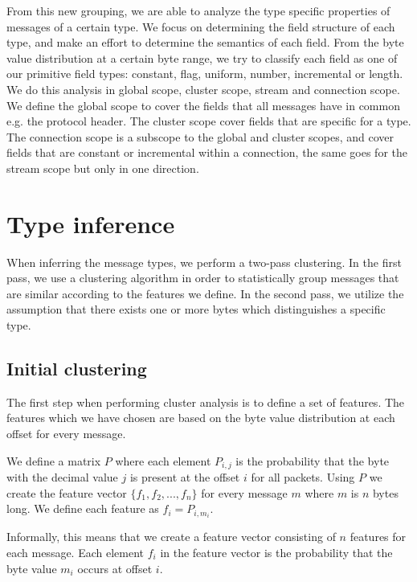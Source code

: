 \documentclass[a4paper]{report}
\begin{document}
From this new grouping, we are able to analyze the type specific properties
of messages of a certain type. We focus on determining the field structure of
each type, and make an effort to determine the semantics of each field.
From the byte value distribution at a certain byte range, we try to classify
each field as one of our primitive field types: constant, flag, uniform,
number, incremental or length. We do this analysis in global scope, cluster
scope, stream and connection scope. We define the global scope to cover the
fields that all messages have in common e.g. the protocol header. The cluster
scope cover fields that are specific for a type. The connection scope is a
subscope to the global and cluster scopes, and cover fields that are constant
or incremental within a connection, the same goes for the stream scope but only
in one direction.

\section{Type inference}
\label{sec:type_inf}
When inferring the message types, we perform a two-pass clustering. In the
first pass, we use a clustering algorithm in order to statistically group
messages that are similar according to the features we define. In the second
pass, we utilize the assumption that there exists one or more bytes which
distinguishes a specific type.

\subsection{Initial clustering}
\label{sec:init_clust}
The first step when performing cluster analysis is to define a set of features.
The features which we have chosen are based on the byte value distribution at
each offset for every message.

We define a matrix $P$ where each element $P_{i,j}$ is the probability that
the byte with the decimal value $j$ is present at the offset $i$ for all
packets. Using $P$ we create the feature vector $\{f_1, f_2, ..., f_n\}$ for
every message $m$ where $m$ is $n$ bytes long. We define each feature as
$f_i = P_{i, m_i}$.

Informally, this means that we create a feature vector consisting of $n$
features for each message. Each element $f_i$ in the feature vector is the
probability that the byte value $m_i$ occurs at offset $i$.
\end{document}
